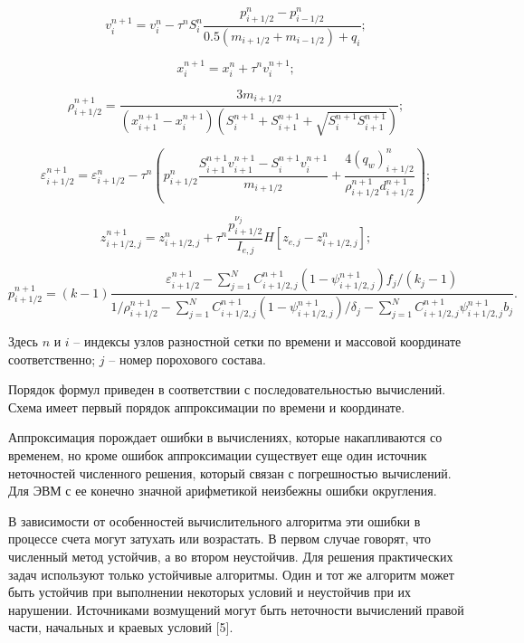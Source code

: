 \documentclass[14pt, a4paper]{report} %
\begin{document}
\begin{equation}
v_i^{n+1} = v_i^n - \tau^n S_i^n \frac{p_{i+1/2}^n - p_{i-1/2}^n}{0.5 (m_{i+1/2} + m_{i-1/2}) + q_i};
\label{1.64}
\end{equation}

\begin{equation}
x_i^{n+1} = x_i^n + \tau^n v_i^{n+1};
\end{equation}

\begin{equation}
\rho_{i+1/2}^{n+1} = \frac{3m_{i+1/2}}{(x_{i+1}^{n+1} - x_i^{n+1}) (S_i^{n+1} + S_{i+1}^{n+1} + \sqrt{S_i^{n+1} S_{i+1}^{n+1}})};
\end{equation}

\begin{equation}
\varepsilon_{i+1/2}^{n+1} = \varepsilon_{i+1/2}^n - \tau^n \left( p_{i+1/2}^n \frac{S_{i+1}^{n+1} v_{i+1}^{n+1} - S_i^{n+1} v_i^{n+1}}{m_{i+1/2}} + \frac{4(q_w)_{i+1/2}^n}{\rho_{i+1/2}^{n+1} d_{i+1/2}^{n+1}} \right);
\end{equation}

\begin{equation}
z_{i+1/2,j}^{n+1} = z_{i+1/2,j}^n + \tau^n \frac{p_{i+1/2}^{\nu_j}}{I_{e,j}} H [z_{e,j} - z_{i+1/2,j}^n];
\end{equation}

\begin{equation}
p_{i+1/2}^{n+1} = (k-1) \frac{\varepsilon_{i+1/2}^{n+1} - \sum_{j=1}^N C_{i+1/2,j}^{n+1} (1 - \psi_{i+1/2,j}^{n+1}) f_j / (k_j - 1)}{1/\rho_{i+1/2}^{n+1} - \sum_{j=1}^N C_{i+1/2,j}^{n+1} (1 - \psi_{i+1/2,j}^{n+1}) / \delta_j - \sum_{j=1}^N C_{i+1/2,j}^{n+1} \psi_{i+1/2,j}^{n+1} b_j}.
\end{equation}

Здесь \( n \) и \( i \) -- индексы узлов разностной сетки по времени и массовой координате соответственно; \( j \) -- номер порохового состава.

Порядок формул приведен в соответствии с последовательностью вычислений. Схема имеет первый порядок аппроксимации по времени и координате.

Аппроксимация порождает ошибки в вычислениях, которые накапливаются со временем, но кроме ошибок аппроксимации существует еще один источник неточностей численного решения, который связан с погрешностью вычислений. Для ЭВМ с ее конечно значной арифметикой неизбежны ошибки округления.

В зависимости от особенностей вычислительного алгоритма эти ошибки в процессе счета могут затухать или возрастать. В первом случае говорят, что численный метод устойчив, а во втором неустойчив. Для решения практических задач используют только устойчивые алгоритмы. Один и тот же алгоритм может быть устойчив при выполнении некоторых условий и неустойчив при их нарушении. Источниками возмущений могут быть неточности вычислений правой части, начальных и краевых условий [5].
\end{document}
